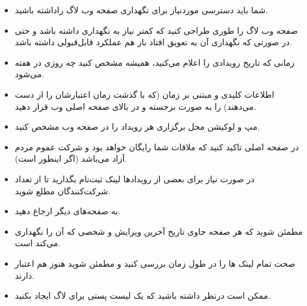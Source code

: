 \begin{itemize}
\item
شما باید دسترسی موردنیاز برای نگهداری صفحه وب لاگ راداشته باشید.
\item
صفحه وب لاگ را طوری طراحی کنید که کمتر نیاز به نگهداری داشته باشد و حتی در صورتی که
نگهداری آن به تعویق افتاد باز هم عملکرد قابل‌قبولی داشته باشد.
\item
زمانی که تاریخ رویدادی را اعلام می‌کنید، همیشه مشخص کنید چه روزی در هفته می‌شود.
\item
اطلاعات کلیدی و مبتنی بر زمان (که با گذشت زمان اعتبارشان را از دست می‌دهند)
را به صورت برجسته و در بالای صفحه اصلی وب قرار دهید.
\item
مپ و لوکیشن محل برگزاری هر رویداد را در صفحه وب مشخص کنید.
\item
در صفحه اصلی تاکید کنید که ملاقات شما رایگان خواهد بود و شرکت عموم مردم آزاد می‌باشد
(اگر اینطور است).
\item
در صورت نیاز برای بعضی از رویدادها لینک ثبت‌نام بگذارید تا از تعداد شرکت‌کنندگان مطلع شوید.
\item
به صفحه‌های دیگر ارجاع دهید.
\item
مطمئن شوید که هر صفحه حاوی تاریخ آخرین ویرایش و شخصی که آن را نگهداری می‌کند است.
\item
صحت تمام لینک ها را در طول زمان بررسی کنید و مطمئن شوید هنوز هم اعتبار دارند.
\item
ممکن است درنظر داشته باشید که یک لیست پستی برای لاگ ایجاد بکنید.

\end{itemize}
